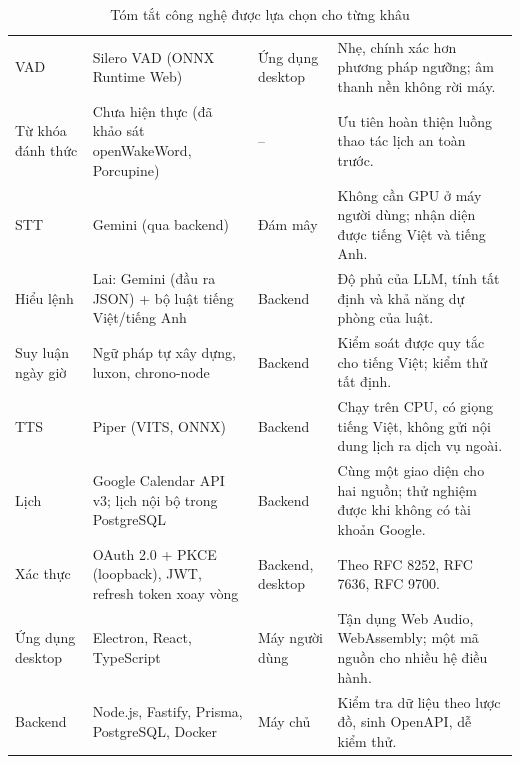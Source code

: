 \begin{table}[!htbp]
\caption{Tóm tắt công nghệ được lựa chọn cho từng khâu}\label{tab:tech-summary}
\bang
\begin{tabularx}{\textwidth}{|L{2.9cm}|L{3.6cm}|L{2.4cm}|Y|}\hline
{} &  &  & \\\hline
VAD & Silero VAD (ONNX Runtime Web) & Ứng dụng desktop & Nhẹ, chính xác hơn phương pháp ngưỡng; âm thanh nền không rời máy.\\\hline
Từ khóa đánh thức & Chưa hiện thực (đã khảo sát openWakeWord, Porcupine) & – & Ưu tiên hoàn thiện luồng thao tác lịch an toàn trước.\\\hline
STT & Gemini (qua backend) & Đám mây & Không cần GPU ở máy người dùng; nhận diện được tiếng Việt và tiếng Anh.\\\hline
Hiểu lệnh & Lai: Gemini (đầu ra JSON) + bộ luật tiếng Việt/tiếng Anh & Backend & Độ phủ của LLM, tính tất định và khả năng dự phòng của luật.\\\hline
Suy luận ngày giờ & Ngữ pháp tự xây dựng, luxon, chrono-node & Backend & Kiểm soát được quy tắc cho tiếng Việt; kiểm thử tất định.\\\hline
TTS & Piper (VITS, ONNX) & Backend & Chạy trên CPU, có giọng tiếng Việt, không gửi nội dung lịch ra dịch vụ ngoài.\\\hline
Lịch & Google Calendar API v3; lịch nội bộ trong PostgreSQL & Backend & Cùng một giao diện cho hai nguồn; thử nghiệm được khi không có tài khoản Google.\\\hline
Xác thực & OAuth 2.0 + PKCE (loopback), JWT, refresh token xoay vòng & Backend, desktop & Theo RFC 8252, RFC 7636, RFC 9700.\\\hline
Ứng dụng desktop & Electron, React, TypeScript & Máy người dùng & Tận dụng Web Audio, WebAssembly; một mã nguồn cho nhiều hệ điều hành.\\\hline
Backend & Node.js, Fastify, Prisma, PostgreSQL, Docker & Máy chủ & Kiểm tra dữ liệu theo lược đồ, sinh OpenAPI, dễ kiểm thử.\\\hline
\end{tabularx}
\end{table}
